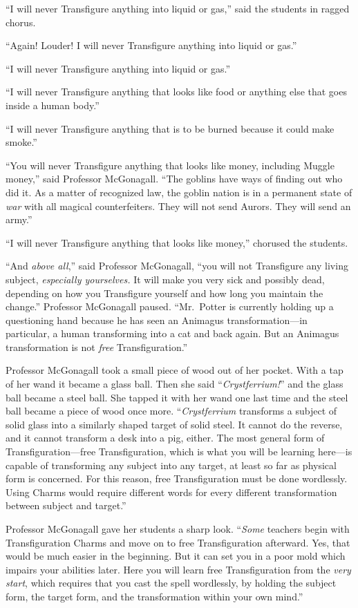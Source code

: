 “I will never Transfigure anything into liquid or gas,” said the students in ragged chorus.

“Again! Louder! I will never Transfigure anything into liquid or gas.”

“I will never Transfigure anything into liquid or gas.”

“I will never Transfigure anything that looks like food or anything else that goes inside a human body.”

“I will never Transfigure anything that is to be burned because it could make smoke.”

“You will never Transfigure anything that looks like money, including Muggle money,” said Professor McGonagall. “The goblins have ways of finding out who did it. As a matter of recognized law, the goblin nation is in a permanent state of \emph{war} with all magical counterfeiters. They will not send Aurors. They will send an army.”

“I will never Transfigure anything that looks like money,” chorused the students.

“And \emph{above all},” said Professor McGonagall, “you will not Transfigure any living subject, \emph{especially yourselves.} It will make you very sick and possibly dead, depending on how you Transfigure yourself and how long you maintain the change.” Professor McGonagall paused. “Mr.~Potter is currently holding up a questioning hand because he has seen an Animagus transformation—in particular, a human transforming into a cat and back again. But an Animagus transformation is not \emph{free} Transfiguration.”

Professor McGonagall took a small piece of wood out of her pocket. With a tap of her wand it became a glass ball. Then she said “\emph{Crystferrium!}” and the glass ball became a steel ball. She tapped it with her wand one last time and the steel ball became a piece of wood once more. “\emph{Crystferrium} transforms a subject of solid glass into a similarly shaped target of solid steel. It cannot do the reverse, and it cannot transform a desk into a pig, either. The most general form of Transfiguration—free Transfiguration, which is what you will be learning here—is capable of transforming any subject into any target, at least so far as physical form is concerned. For this reason, free Transfiguration must be done wordlessly. Using Charms would require different words for every different transformation between subject and target.”

Professor McGonagall gave her students a sharp look. “\emph{Some} teachers begin with Transfiguration Charms and move on to free Transfiguration afterward. Yes, that would be much easier in the beginning. But it can set you in a poor mold which impairs your abilities later. Here you will learn free Transfiguration from the \emph{very start}, which requires that you cast the spell wordlessly, by holding the subject form, the target form, and the transformation within your own mind.”

